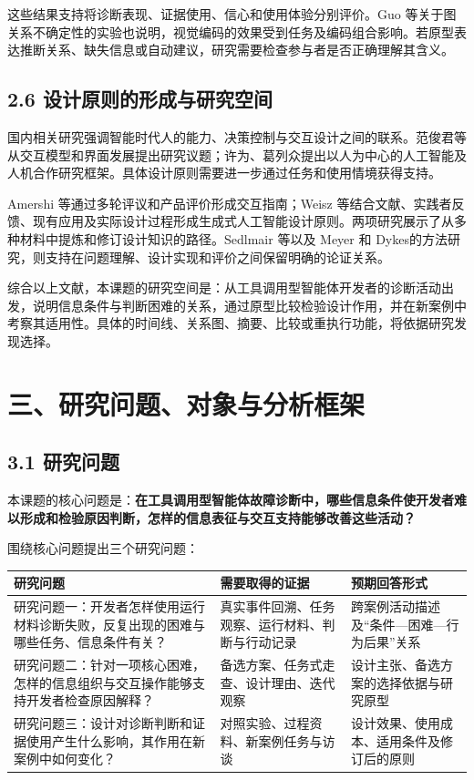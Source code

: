 这些结果支持将诊断表现、证据使用、信心和使用体验分别评价。Guo 等\cite{ref62}关于图关系不确定性的实验也说明，视觉编码的效果受到任务及编码组合影响。若原型表达推断关系、缺失信息或自动建议，研究需要检查参与者是否正确理解其含义。

\subsection{2.6 设计原则的形成与研究空间}

国内相关研究强调智能时代人的能力、决策控制与交互设计之间的联系。范俊君等\cite{ref42}从交互模型和界面发展提出研究议题；许为、葛列众\cite{ref63}提出以人为中心的人工智能及人机合作研究框架。具体设计原则需要进一步通过任务和使用情境获得支持。

Amershi 等\cite{ref48}通过多轮评议和产品评价形成交互指南；Weisz 等\cite{ref66}结合文献、实践者反馈、现有应用及实际设计过程形成生成式人工智能设计原则。两项研究展示了从多种材料中提炼和修订设计知识的路径。Sedlmair 等\cite{sedlmair2012design}以及 Meyer 和 Dykes\cite{meyer2020rigor}的方法研究，则支持在问题理解、设计实现和评价之间保留明确的论证关系。

综合以上文献，本课题的研究空间是：从工具调用型智能体开发者的诊断活动出发，说明信息条件与判断困难的关系，通过原型比较检验设计作用，并在新案例中考察其适用性。具体的时间线、关系图、摘要、比较或重执行功能，将依据研究发现选择。

\section{三、研究问题、对象与分析框架}

\subsection{3.1 研究问题}

本课题的核心问题是：\textbf{在工具调用型智能体故障诊断中，哪些信息条件使开发者难以形成和检验原因判断，怎样的信息表征与交互支持能够改善这些活动？}

围绕核心问题提出三个研究问题：

\begin{table}[H]
  \centering
  \small
  \begin{tabularx}{\textwidth}{Y Y Y}
    \toprule
    研究问题 & 需要取得的证据 & 预期回答形式 \\
    \midrule
    研究问题一：开发者怎样使用运行材料诊断失败，反复出现的困难与哪些任务、信息条件有关？ & 真实事件回溯、任务观察、运行材料、判断与行动记录 & 跨案例活动描述及“条件—困难—行为后果”关系 \\
    研究问题二：针对一项核心困难，怎样的信息组织与交互操作能够支持开发者检查原因解释？ & 备选方案、任务式走查、设计理由、迭代观察 & 设计主张、备选方案的选择依据与研究原型 \\
    研究问题三：设计对诊断判断和证据使用产生什么影响，其作用在新案例中如何变化？ & 对照实验、过程资料、新案例任务与访谈 & 设计效果、使用成本、适用条件及修订后的原则 \\
    \bottomrule
  \end{tabularx}
\end{table}

